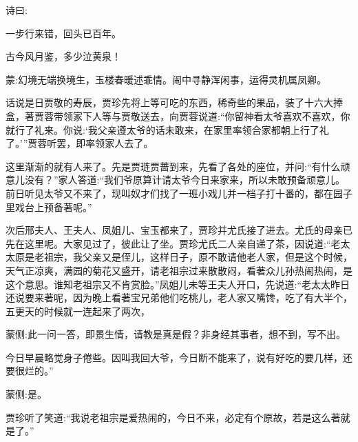 
\begin{parag}
    诗曰:
\end{parag}


\begin{poem}
    \begin{pl}一步行来错，回头已百年。\end{pl}


    \begin{pl}古今风月鉴，多少泣黄泉！\end{pl}
\end{poem}


\begin{parag}
    \begin{note}蒙:幻境无端换境生，玉楼春暖述乖情。闹中寻静浑闲事，运得灵机属凤卿。\end{note}
\end{parag}


\begin{parag}
    话说是日贾敬的寿辰，贾珍先将上等可吃的东西，稀奇些的果品，装了十六大捧盒，著贾蓉带领家下人等与贾敬送去，向贾蓉说道:“你留神看太爷喜欢不喜欢，你就行了礼来。你说:‘我父亲遵太爷的话未敢来，在家里率领合家都朝上行了礼了。’”贾蓉听罢，即率领家人去了。
\end{parag}


\begin{parag}
    这里渐渐的就有人来了。先是贾琏贾蔷到来，先看了各处的座位，并问:“有什么顽意儿没有？”家人答道:“我们爷原算计请太爷今日来家来，所以未敢预备顽意儿。前日听见太爷又不来了，现叫奴才们找了一班小戏儿并一档子打十番的，都在园子里戏台上预备著呢。”
\end{parag}


\begin{parag}
    次后邢夫人、王夫人、凤姐儿、宝玉都来了，贾珍并尤氏接了进去。尤氏的母亲已先在这里呢。大家见过了，彼此让了坐。贾珍尤氏二人亲自递了茶，因说道:“老太太原是老祖宗，我父亲又是侄儿，这样日子，原不敢请他老人家，但是这个时候，天气正凉爽，满园的菊花又盛开，请老祖宗过来散散闷，看著众儿孙热闹热闹，是这个意思。谁知老祖宗又不肯赏脸。”凤姐儿未等王夫人开口，先说道:“老太太昨日还说要来著呢，因为晚上看著宝兄弟他们吃桃儿，老人家又嘴馋，吃了有大半个，五更天的时候就一连起来了两次，\begin{note}蒙侧:此一问一答，即景生情，请教是真是假？非身经其事者，想不到，写不出。\end{note}今日早晨略觉身子倦些。因叫我回大爷，今日断不能来了，说有好吃的要几样，还要很烂的。”\begin{note}蒙侧:是。\end{note}贾珍听了笑道:“我说老祖宗是爱热闹的，今日不来，必定有个原故，若是这么著就是了。”
\end{parag}


